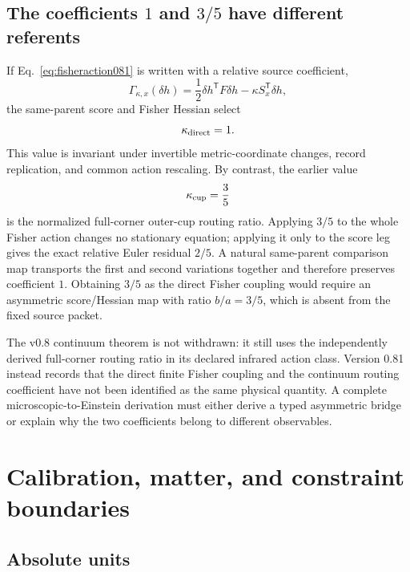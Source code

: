 \documentclass[11pt]{article}
\theoremstyle{definition}
\theoremstyle{remark}
\begin{document}
\subsection{The coefficients $1$ and $3/5$ have different referents}

If Eq.~\eqref{eq:fisheraction081} is written with a relative source coefficient,
\begin{equation}
 \Gamma_{\kappa,x}(\delta h)
 =\frac12\delta h^{\mathsf T}F\delta h
 -\kappa S_x^{\mathsf T}\delta h,
\end{equation}
the same-parent score and Fisher Hessian select
\begin{equation}
 \kappa_{\rm direct}=1.
\end{equation}
This value is invariant under invertible metric-coordinate changes, record replication, and common action rescaling. By contrast, the earlier value
\begin{equation}
 \kappa_{\rm cup}=\frac35
\end{equation}
is the normalized full-corner outer-cup routing ratio. Applying $3/5$ to the whole Fisher action changes no stationary equation; applying it only to the score leg gives the exact relative Euler residual $2/5$. A natural same-parent comparison map transports the first and second variations together and therefore preserves coefficient $1$. Obtaining $3/5$ as the direct Fisher coupling would require an asymmetric score/Hessian map with ratio $b/a=3/5$, which is absent from the fixed source packet.

The v0.8 continuum theorem is not withdrawn: it still uses the independently derived full-corner routing ratio in its declared infrared action class. Version 0.81 instead records that the direct finite Fisher coupling and the continuum routing coefficient have not been identified as the same physical quantity. A complete microscopic-to-Einstein derivation must either derive a typed asymmetric bridge or explain why the two coefficients belong to different observables.

\section{Calibration, matter, and constraint boundaries}\label{sec:boundaries081}

\subsection{Absolute units}
\end{document}
